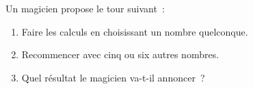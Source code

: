 \documentclass[exercice]{thedocument}%
\begin{document}
%
    Un magicien propose le tour suivant~:
    \begin{enumerate}
        \item Faire les calculs en choisissant un nombre quelconque.
        \item Recommencer avec cinq ou six autres nombres.
        \item Quel résultat le magicien va-t-il annoncer~?
    \end{enumerate}
\end{document}
